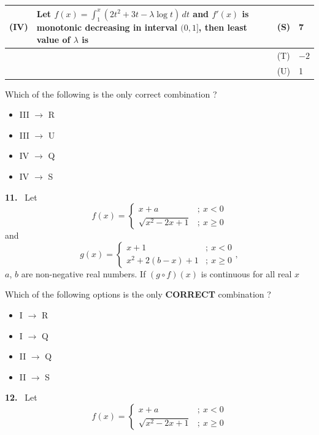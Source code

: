\documentclass[10pt]{extarticle}
\newcommand{\qn}[1]{\par\smallskip\noindent\textbf{#1.}~}
\newenvironment{qoptions}{\begin{itemize}[leftmargin=1.8em,itemsep=1pt,topsep=2pt,label={}]}{\end{itemize}}
\newcommand{\opt}[2]{\item[(#1)] #2}
\begin{document}
\begin{multicols}{2}
{\begin{tabular}{|L{.9cm}|L{3.5cm}|L{.9cm}|L{1.9cm}|}
(IV) & Let $f(x)=\displaystyle\int_1^x(2t^2+3t-\lambda\log t)\,dt$ and $f'(x)$ is monotonic decreasing in interval $(0,1]$, then least value of $\lambda$ is & (S) & 7\\\hline
 & & (T) & $-2$\\\hline
 & & (U) & 1\\\hline
\end{tabular}}\par
\smallskip
Which of the following is the only correct combination ?
\begin{qoptions}
\opt{A}{III $\to$ R}
\opt{B}{III $\to$ U}
\opt{C}{IV $\to$ Q}
\opt{D}{IV $\to$ S}
\end{qoptions}
\qn{11} Let
\[f(x)=\begin{cases}x+a & ;\ x<0\\ \sqrt{x^2-2x+1} & ;\ x\ge0\end{cases}\]
and
\[g(x)=\begin{cases}x+1 & ;\ x<0\\ x^2+2(b-x)+1 & ;\ x\ge0\end{cases},\]
$a$, $b$ are non-negative real numbers. If $(g\circ f)(x)$ is continuous for all real $x$\par
\smallskip
{}\par
\smallskip
Which of the following options is the only \textbf{CORRECT} combination ?
\begin{qoptions}
\opt{A}{I $\to$ R}
\opt{B}{I $\to$ Q}
\opt{C}{II $\to$ Q}
\opt{D}{II $\to$ S}
\end{qoptions}
\qn{12} Let
\[f(x)=\begin{cases}x+a & ;\ x<0\\ \sqrt{x^2-2x+1} & ;\ x\ge0\end{cases}\]

\end{multicols}
\end{document}
